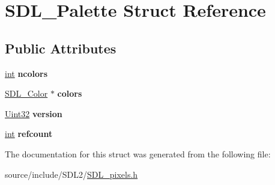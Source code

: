 \hypertarget{struct_s_d_l___palette}{}\section{S\+D\+L\+\_\+\+Palette Struct Reference}
\label{struct_s_d_l___palette}
\subsection*{Public Attributes}
\begin{DoxyCompactItemize}
\item 
\hypertarget{struct_s_d_l___palette_a81a0cc3197480e994c6b06f1f0567091}{}\hyperlink{_s_d_l__thread_8h_a6a64f9be4433e4de6e2f2f548cf3c08e}{int} {\bfseries ncolors}\label{struct_s_d_l___palette_a81a0cc3197480e994c6b06f1f0567091}

\item 
\hypertarget{struct_s_d_l___palette_ad757a50037f43533196e94942440b241}{}\hyperlink{struct_s_d_l___color}{S\+D\+L\+\_\+\+Color} $\ast$ {\bfseries colors}\label{struct_s_d_l___palette_ad757a50037f43533196e94942440b241}

\item 
\hypertarget{struct_s_d_l___palette_a5b8d45519f6850a32f13f1602ce37a8e}{}\hyperlink{_s_d_l__stdinc_8h_add440eff171ea5f55cb00c4a9ab8672d}{Uint32} {\bfseries version}\label{struct_s_d_l___palette_a5b8d45519f6850a32f13f1602ce37a8e}

\item 
\hypertarget{struct_s_d_l___palette_a35c667737f883f973bb0a8dea143b08d}{}\hyperlink{_s_d_l__thread_8h_a6a64f9be4433e4de6e2f2f548cf3c08e}{int} {\bfseries refcount}\label{struct_s_d_l___palette_a35c667737f883f973bb0a8dea143b08d}

\end{DoxyCompactItemize}


The documentation for this struct was generated from the following file\+:\begin{DoxyCompactItemize}
\item 
source/include/\+S\+D\+L2/\hyperlink{_s_d_l__pixels_8h}{S\+D\+L\+\_\+pixels.\+h}\end{DoxyCompactItemize}
